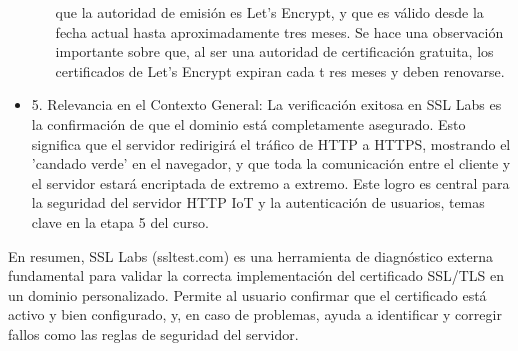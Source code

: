 \documentclass{report}
\begin{document}
\begin{itemize}
\begin{itemize}
            que la autoridad de emisión es Let's Encrypt, y que es válido desde la fecha actual hasta aproximadamente tres meses. Se hace una 
            observación importante sobre que, al ser una autoridad de certificación gratuita, los certificados de Let's Encrypt expiran cada t
            res meses y deben renovarse.
        \end{itemize}
    \item 5. Relevancia en el Contexto General: La verificación exitosa en SSL Labs es la confirmación de que el dominio está completamente 
    asegurado. Esto significa que el servidor redirigirá el tráfico de HTTP a HTTPS, mostrando el 'candado verde' en el navegador, y que 
    toda la comunicación entre el cliente y el servidor estará encriptada de extremo a extremo. Este logro es central para la seguridad del 
    servidor HTTP IoT y la autenticación de usuarios, temas clave en la etapa 5 del curso.
\end{itemize}
En resumen, SSL Labs (ssltest.com) es una herramienta de diagnóstico externa fundamental para validar la correcta implementación 
del certificado SSL/TLS en un dominio personalizado. Permite al usuario confirmar que el certificado está activo y bien configurado, 
y, en caso de problemas, ayuda a identificar y corregir fallos como las reglas de seguridad del servidor.
\end{document}
